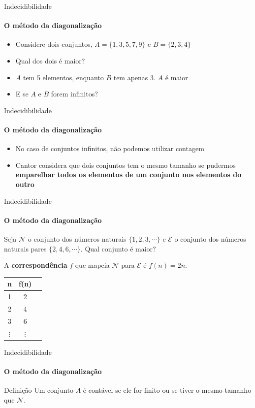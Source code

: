 \documentclass{beamer}
\begin{document}
\begin{frame}{Indecidibilidade}
	\framesubtitle{O método da diagonalização}
	\begin{itemize}
		\item Considere dois conjuntos, $A=\{1,3,5,7,9\}$ e $B=\{2,3,4\}$
		\item Qual dos dois é maior?\pause
		\item $A$ tem 5 elementos, enquanto $B$ tem apenas 3. $A$ é maior\pause
		\item E se $A$ e $B$ forem infinitos?
	\end{itemize}
\end{frame}
\begin{frame}{Indecidibilidade}
	\framesubtitle{O método da diagonalização}
	\begin{itemize}
		\item No caso de conjuntos infinitos, não podemos utilizar contagem
		\item Cantor considera que dois conjuntos tem o mesmo tamanho se pudermos \textbf{emparelhar todos os elementos de um conjunto nos elementos do outro}
	\end{itemize}
\end{frame}
\begin{frame}{Indecidibilidade}
	\framesubtitle{O método da diagonalização}
	Seja $\mathscr{N}$ o conjunto dos números naturais $\{1,2,3,\cdots\}$ e $\mathscr{E}$ o conjunto dos números naturais pares $\{2,4,6,\cdots\}$. Qual conjunto é maior?\pause
	
	A \textbf{correspondência} $f$ que mapeia $\mathscr{N}$ para $\mathscr{E}$ é $f(n) = 2n$.
	
	\begin{table}[!b]
		{\carlitoTLF
			\begin{tabular}{ccc}
				\textbf{n} & \textbf{f(n)} \\
				\toprule
				1 & 2 \\
				2 & 4 \\
				3 & 6 \\
				$\vdots$ & $\vdots$ \\
				\bottomrule
			\end{tabular}}
		\end{table}
\end{frame}
\begin{frame}{Indecidibilidade}
\framesubtitle{O método da diagonalização}
	\begin{block}{Definição}
		Um conjunto $A$ é \alert{contável} se ele for finito ou se tiver o mesmo tamanho que $\mathscr{N}$.
	\end{block}
\end{frame}
\end{document}
